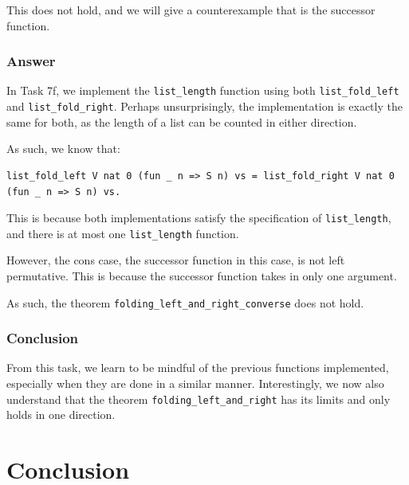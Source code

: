 \documentclass{article}
\begin{document}
This does not hold, and we will give a counterexample that is the successor function.

\subsubsection{Answer}
In Task 7f, we implement the \texttt{list\_length} function using both \texttt{list\_fold\_left} and \texttt{list\_fold\_right}. Perhaps unsurprisingly, the implementation is exactly the same for both, as the length of a list can be counted in either direction. 

As such, we know that:

\begin{lstlisting}
list_fold_left V nat 0 (fun _ n => S n) vs = list_fold_right V nat 0 (fun _ n => S n) vs.
\end{lstlisting}

This is because both implementations satisfy the specification of \texttt{list\_length}, and there is at most one \texttt{list\_length} function.

However, the cons case, the successor function in this case, is not left permutative. This is because the successor function takes in only one argument. 

As such, the theorem \texttt{folding\_left\_and\_right\_converse} does not hold.

\subsubsection{Conclusion}
From this task, we learn to be mindful of the previous functions implemented, especially when they are done in a similar manner. Interestingly, we now also understand that the theorem \texttt{folding\_left\_and\_right} has its limits and only holds in one direction.


\newpage

\section{Conclusion}
\end{document}
